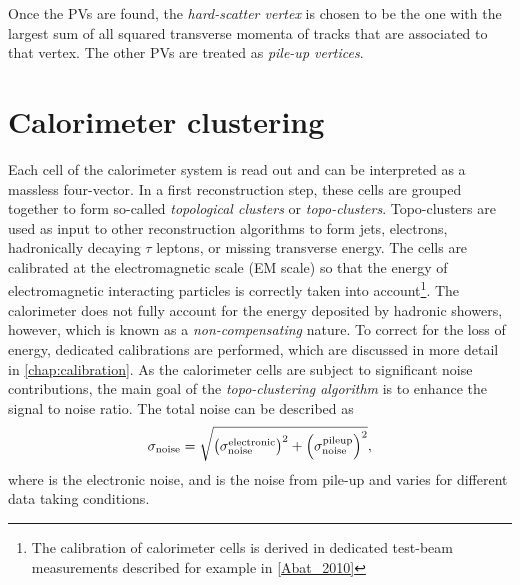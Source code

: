 Once the PVs are found, the \emph{hard-scatter vertex} is chosen to be the one with the largest sum of all squared transverse momenta of tracks that are associated to that vertex. The other PVs are treated as \emph{pile-up vertices}.




\section{Calorimeter clustering}
Each cell of the calorimeter system is read out and can be interpreted as a massless four-vector. In a first reconstruction step, these cells are grouped together to form so-called \emph{topological clusters} or \emph{topo-clusters}. Topo-clusters are used as input to other reconstruction algorithms to form jets, electrons, hadronically decaying $\tau$ leptons, or missing transverse energy. 
The cells are calibrated at the electromagnetic scale (EM scale) so that the energy of electromagnetic interacting particles is correctly taken into account\footnote{The calibration of calorimeter cells is derived in dedicated test-beam measurements described for example in \cref{Abat_2010}}. The calorimeter does not fully account for the energy deposited by hadronic showers, however, which is known as a \emph{non-compensating} nature.
To correct for the loss of energy, dedicated calibrations are performed, which are discussed in more detail in \cref{chap:calibration}.
As the calorimeter cells are subject to significant noise contributions, the main goal of the \emph{topo-clustering algorithm} is to enhance the signal to noise ratio. The total noise can be described as
\begin{equation}
    \sigma_{\text{noise}} = \sqrt{ \left( \sigma_{\text{noise}}^{\text{electronic}}  \right)^2  + \left( \sigma_{\text{noise}}^{\text{pileup}}  \right)^2 },
\end{equation}
where \electronicnoise is the electronic noise, and \pileupnoise is the noise from pile-up and varies for different data taking conditions. 

